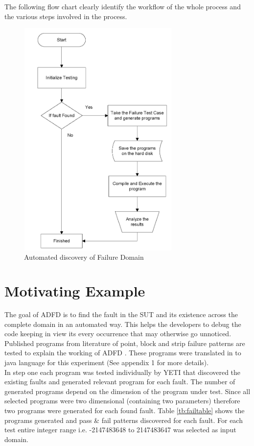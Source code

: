 \documentclass{acm_proc_article-sp}
\begin{document}
The following flow chart clearly identify the workflow of the whole process and the various steps involved in the process.

\begin{figure}[htp]
\centering
\includegraphics[width=8cm,height=12cm]{automatedFail.png}
\caption{Automated discovery of Failure Domain}
\label{fig:autofail}
\end{figure}


\section{Motivating Example}
The goal of ADFD is to find the fault in the SUT and its existence across the complete domain in an automated way. This helps the developers to debug the code keeping in view its every occurrence that may otherwise go unnoticed.
Published programs from literature \cite{Chen2003}\cite{Chan1996}\cite{Chen2004} of point, block and strip failure patterns are tested to explain the working of ADFD . These programs were translated in to java language for this experiment (See appendix 1 for more details). \\

In step one each program was tested individually by YETI that discovered the existing faults and generated relevant program for each fault. The number of generated programs depend on the dimension of the program under test. Since all selected programs were two dimensional (containing two parameters) therefore two programs were generated for each found fault. Table \ref{tb:failtable} shows the programs generated and pass \& fail patterns discovered for each fault. For each test entire integer range i.e. -2147483648 to 2147483647 was selected as input domain.\\
\end{document}
